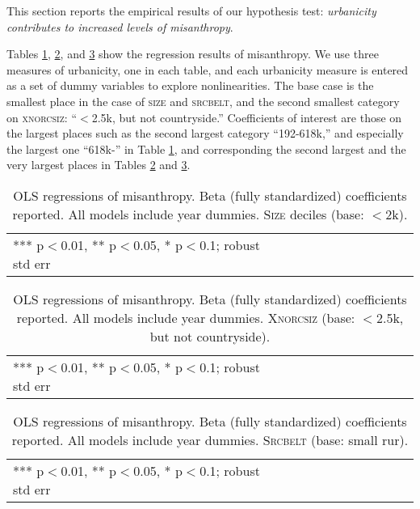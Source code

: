 \documentclass[11pt, letterpaper]{article}
\begin{document}
\begin{spacing}{1.4}
This section reports the empirical results of our hypothesis test:
 \textit{urbanicity contributes to increased levels of misanthropy}.

Tables \ref{regA}, \ref{regB}, and \ref{regC} show the regression results of misanthropy. We use three measures of
urbanicity, one in each table,  and each urbanicity measure is entered as a set of dummy variables to
explore nonlinearities. The base case is the smallest place in the case of
\textsc{size} and \textsc{srcbelt}, and the second smallest category on \textsc{xnorcsiz}:
 ``$<$2.5k, but not countryside.'' Coefficients of interest are those on the
 largest  places such as the second largest category ``192-618k,'' and especially the largest one ``618k-'' in Table
\ref{regA}, and corresponding the second largest and the very largest places in Tables
\ref{regB} and \ref{regC}.

\begin{table}[h!]\centering
\caption{OLS regressions  of misanthropy. Beta (fully standardized) coefficients
  reported. All models include year dummies. \textsc{Size} deciles (base: $<$2k).} \label{regA}
\begin{scriptsize} \begin{tabular}{p{1.8in}p{.45in}p{.45in}p{.45in}p{.45in}p{.45in}p{.45in}p{.45in}p{.45in}p{.45in}p{.45 in}}\hline

\hline  *** p$<$0.01, ** p$<$0.05, * p$<$0.1; robust std err
\end{tabular}\end{scriptsize}\end{table}

\begin{table}[h!]\centering
\caption{OLS regressions  of misanthropy. Beta (fully standardized) coefficients
  reported. All models include year dummies.  \textsc{Xnorcsiz} (base: $<$2.5k, but not countryside).} \label{regB}
\begin{scriptsize} \begin{tabular}{p{1.8in}p{.45in}p{.45in}p{.45in}p{.45in}p{.45in}p{.45in}p{.45in}p{.45in}p{.45in}p{.45 in}}\hline

\hline  *** p$<$0.01, ** p$<$0.05, * p$<$0.1; robust std err
\end{tabular}\end{scriptsize}\end{table}

\begin{table}[h!]\centering
\caption{OLS regressions  of misanthropy. Beta (fully standardized) coefficients
  reported. All models include year dummies. \textsc{Srcbelt} (base: small rur).} \label{regC}
\begin{scriptsize} \begin{tabular}{p{1.8in}p{.45in}p{.45in}p{.45in}p{.45in}p{.45in}p{.45in}p{.45in}p{.45in}p{.45in}p{.45 in}}\hline

\hline  *** p$<$0.01, ** p$<$0.05, * p$<$0.1; robust std err
\end{tabular}\end{scriptsize}\end{table}


\end{spacing}
\end{document}
